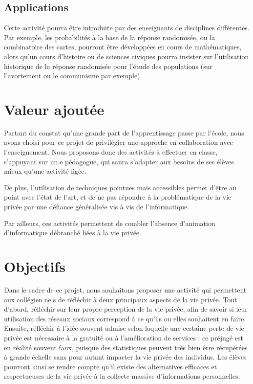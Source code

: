 \documentclass[a4paper]{article}
\begin{document}
\subsection*{Applications}

Cette activité pourra être introduite par des enseignants de disciplines différentes. Par exemple, les probabilités à la base de la réponse randomisée, ou la combinatoire des cartes, pourront être développées en cours de mathématiques, alors qu'un cours d'histoire ou de sciences civiques pourra insister sur l'utilisation historique de la réponse randomisée pour l'étude des populations (sur l'avortement ou le communisme par exemple).

\section*{Valeur ajoutée}

Partant du constat qu'une grande part de l'apprentissage passe par l'école, nous avons choisi pour ce projet de privilégier une approche en collaboration avec l'enseignement.
Nous proposons donc des activités à effectuer en classe, s'appuyant sur un.e pédagogue, qui saura s'adapter aux besoins de ses élèves mieux qu'une activité figée.

De plus, l'utilisation de techniques pointues mais accessibles permet d'être au point avec l'état de l'art, et de ne pas répondre à la problématique de la vie privée par une défiance généralisée vis à vis de l'informatique.

Par ailleurs, ces activités permettent de combler l'absence d'animation d'informatique débranché liées à la vie privée.

\section*{Objectifs}

Dans le cadre de ce projet, nous souhaitons proposer une activité qui permettent aux collégien.ne.s de réfléchir à deux principaux aspects de la vie privée.
Tout d'abord, réfléchir sur leur propre perception de la vie privée, afin de savoir si leur utilisation des réseaux sociaux correspond à ce qu'ils ou elles souhaitent en faire.
Ensuite, réfléchir à l'idée souvent admise selon laquelle une certaine perte de vie privée est nécessaire à la gratuité ou à l'amélioration de services : ce préjugé est en réalité souvent faux, puisque des statistiques peuvent très bien être récupérées à grande échelle sans pour autant impacter la vie privée des individus.
Les élèves pourront ainsi se rendre compte qu'il existe des alternatives efficaces et respectueuses de la vie privée à la collecte massive d'informations personnelles.
\end{document}
